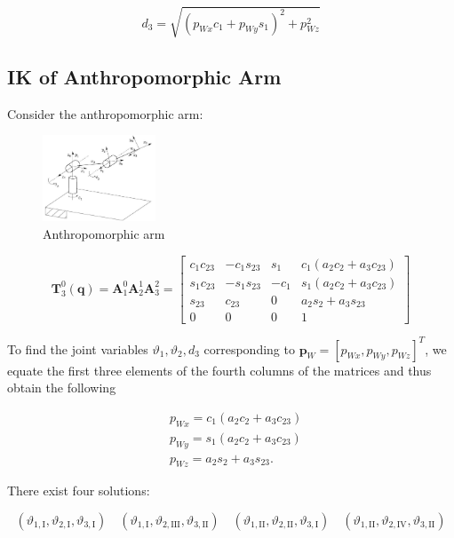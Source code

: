 \documentclass[10pt]{article}
\begin{document}
$$
d_{3}=\sqrt{\left(p_{W x} c_{1}+p_{W y} s_{1}\right)^{2}+p_{W z}^{2}}
$$


\subsection{IK of Anthropomorphic Arm}


Consider the anthropomorphic arm:

\begin{figure}[H]
    \centering
   \includegraphics[max width=0.3\textwidth]{./kinematics/anthropomorphic_arm}
   \caption{Anthropomorphic arm}
\end{figure}




$$
\boldsymbol{T}_{3}^{0}(\boldsymbol{q})=\boldsymbol{A}_{1}^{0} \boldsymbol{A}_{2}^{1} \boldsymbol{A}_{3}^{2}=\left[\begin{array}{cccc}
c_{1} c_{23} & -c_{1} s_{23} & s_{1} & c_{1}\left(a_{2} c_{2}+a_{3} c_{23}\right) \\
s_{1} c_{23} & -s_{1} s_{23} & -c_{1} & s_{1}\left(a_{2} c_{2}+a_{3} c_{23}\right) \\
s_{23} & c_{23} & 0 & a_{2} s_{2}+a_{3} s_{23} \\
0 & 0 & 0 & 1
\end{array}\right]
$$



To find the joint variables $\vartheta_{1}, \vartheta_{2}, d_{3}$ corresponding to  $\boldsymbol{p}_{W}=[p_{Wx}, p_{Wy}, p_{Wz}]^T$, we equate the first three elements of the fourth columns of the matrices and thus obtain the following 


$$
\begin{aligned}
& p_{W x}=c_{1}\left(a_{2} c_{2}+a_{3} c_{23}\right) \\
& p_{W y}=s_{1}\left(a_{2} c_{2}+a_{3} c_{23}\right) \\
& p_{W z}=a_{2} s_{2}+a_{3} s_{23} .
\end{aligned}
$$


\noindent
There exist four solutions:

$$
\left(\vartheta_{1, \mathrm{I}}, \vartheta_{2, \mathrm{I}}, \vartheta_{3, \mathrm{I}}\right) \quad\left(\vartheta_{1, \mathrm{I}}, \vartheta_{2, \mathrm{III}}, \vartheta_{3, \mathrm{II}}\right) \quad\left(\vartheta_{1, \mathrm{II}}, \vartheta_{2, \mathrm{II}}, \vartheta_{3, \mathrm{I}}\right) \quad\left(\vartheta_{1, \mathrm{II}}, \vartheta_{2, \mathrm{IV}}, \vartheta_{3, \mathrm{II}}\right)
$$
\end{document}
